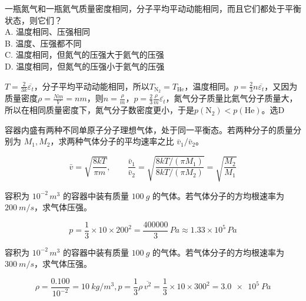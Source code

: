 \documentclass[lang=cn,11pt]{elegantbook}
\begin{document}
\begin{exercise}
一瓶氮气和一瓶氦气质量密度相同，分子平均平动动能相同，而且它们都处于平衡状态，则它们？\\
A. 温度相同、压强相同\\
B. 温度、压强都不同\\
C. 温度相同，但氮气的压强大于氦气的压强\\
D. 温度相同，但氮气的压强小于氦气的压强
\end{exercise}
\begin{solution}
\(T=\frac{2}{3k}\overline{\varepsilon_t}\)，分子平均平动动能相同，所以\(T_{\mathrm{N_2}}=T_{\mathrm{He}}\)，温度相同。\(p=\frac23n\overline{\varepsilon_t}\)，又因为质量密度\(\rho=\frac{Nm}{V}=nm\)，则\(n=\frac{\rho}{m}\)，\(p=\frac23\frac{\rho}{m}\overline{\varepsilon_t}\)，氮气分子质量比氦气分子质量大，所以在相同质量密度下，氮气分子数密度更小，于是\(p(\mathrm{N_2})<p(\mathrm{He})\)。选D
\end{solution}

\begin{exercise}
容器内盛有两种不同单原子分子理想气体，处于同一平衡态。若两种分子的质量分别为 \(M_1,M_2\)，求两种气体分子的平均速率之比 \(\bar v_1/\bar v_2\)。
\end{exercise}

\begin{solution}
 \[\bar v=\sqrt{\frac{8kT}{\pi m}},\qquad \frac{\bar v_1}{\bar v_2} =\sqrt{\frac{8kT/(\pi M_1)}{8kT/(\pi M_2)}} =\sqrt{\frac{M_2}{M_1}}\] 
\end{solution}


\begin{exercise}
容积为 \(10^{-2}\,\si{m^3}\) 的容器中装有质量 \(\SI{100}{g}\) 的气体。若气体分子的方均根速率为 \(\SI{200}{m/s}\)，求气体压强。
\end{exercise}
\begin{solution}
 \[p=\frac13\times 10\times 200^2 =\frac{400000}{3}\,\si{Pa} \approx 1.33\times10^5\,\si{Pa}\]
\end{solution}

\begin{exercise}
容积为 \(10^{-2}\,\si{m^3}\) 的容器中装有质量 \(\SI{100}{g}\) 的气体。若气体分子的方均根速率为 \(\SI{300}{m/s}\)，求气体压强。
\end{exercise}

\begin{solution}
 \[\rho=\frac{0.100}{10^{-2}}=\SI{10}{kg/m^3},p=\frac13\rho\,\overline{v^2}=\frac13\times 10\times 300^2 =\SI{3.0e5}{Pa}\]
\end{solution}
\end{document}

